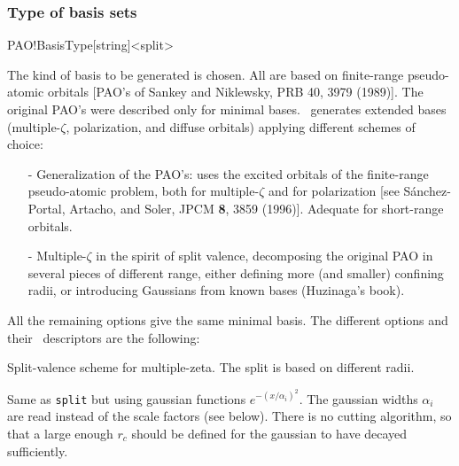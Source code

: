\subsubsection{Type of basis sets}

\begin{fdfentry}{PAO!BasisType}[string]<split>
  
  The kind of basis to be generated is chosen. All are based on
  finite-range pseudo-atomic orbitals [PAO's of Sankey and Niklewsky, PRB 40, 3979
  (1989)]. The original PAO's were described only for minimal
  bases. \siesta\ generates extended bases
  (multiple-$\zeta$,
  polarization, and diffuse
  orbitals) applying different schemes of
  choice:

  \begin{itemize}

    \item[-] Generalization of the PAO's: uses the excited orbitals of
    the finite-range pseudo-atomic problem, both for multiple-$\zeta$
    and for polarization [see S\'anchez-Portal, Artacho, and Soler,
    JPCM \textbf{8}, 3859 (1996)]. Adequate for short-range orbitals.

    \item[-] Multiple-$\zeta$ in the spirit of split
    valence, decomposing the original PAO in
    several pieces of different range, either defining more (and
    smaller) confining radii, or introducing
    Gaussians from known bases (Huzinaga's book).

  \end{itemize}

  \noindent
  All the remaining options give the same minimal basis. The different options and their \fdflib\ descriptors are
  the following:

  \begin{fdfoptions}

    \option[split]%

    Split-valence scheme for multiple-zeta.
    The split is based on different radii.


    \option[splitgauss]%
    
    Same as \texttt{split} but using gaussian functions
    $e^{-(x/\alpha_i)^2}$. The gaussian widths $\alpha_i$ are read
    instead of the scale factors (see below). There is no cutting
    algorithm, so that a large enough $r_c$ should be defined for the
    gaussian to have decayed sufficiently.
    


\end{fdfoptions}
\end{fdfentry}
